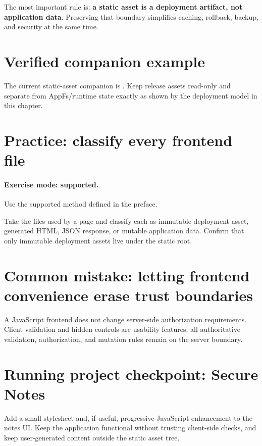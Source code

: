 The most important rule is: \textbf{a static asset is a deployment artifact, not application data}. Preserving that boundary simplifies caching, rollback, backup, and security at the same time.

\section{Verified companion example}
The current static-asset companion is . Keep release assets read-only and separate from AppFs/runtime state exactly as shown by the deployment model in this chapter.

\section{Practice: classify every frontend file}
\paragraph{Exercise mode: supported.} Use the supported method defined in the preface.

Take the files used by a page and classify each as immutable deployment asset, generated HTML, JSON response, or mutable application data. Confirm that only immutable deployment assets live under the static root.

\section{Common mistake: letting frontend convenience erase trust boundaries}
A JavaScript frontend does not change server-side authorization requirements. Client validation and hidden controls are usability features; all authoritative validation, authorization, and mutation rules remain on the server boundary.

\section{Running project checkpoint: Secure Notes}
Add a small stylesheet and, if useful, progressive JavaScript enhancement to the notes UI. Keep the application functional without trusting client-side checks, and keep user-generated content outside the static asset tree.
